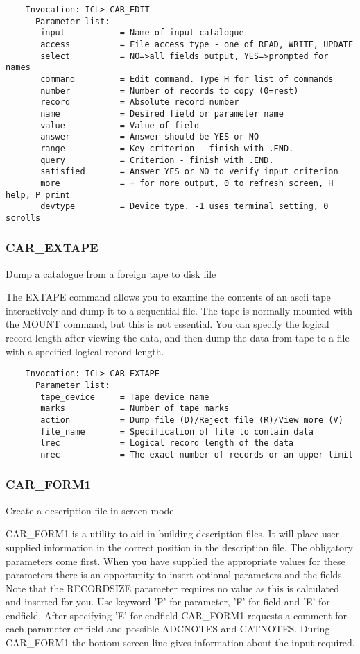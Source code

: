 \begin{verbatim}
    Invocation: ICL> CAR_EDIT
      Parameter list:
       input           = Name of input catalogue
       access          = File access type - one of READ, WRITE, UPDATE
       select          = NO=>all fields output, YES=>prompted for names
       command         = Edit command. Type H for list of commands
       number          = Number of records to copy (0=rest)
       record          = Absolute record number
       name            = Desired field or parameter name
       value           = Value of field
       answer          = Answer should be YES or NO
       range           = Key criterion - finish with .END.
       query           = Criterion - finish with .END.
       satisfied       = Answer YES or NO to verify input criterion
       more            = + for more output, 0 to refresh screen, H help, P print
       devtype         = Device type. -1 uses terminal setting, 0 scrolls
\end{verbatim}

\subsubsection{CAR\_EXTAPE}

Dump a catalogue from a foreign tape to disk file


The EXTAPE command allows you to examine the contents of an ascii tape
interactively and dump it to a sequential file.
The tape is normally mounted with the MOUNT command, but this is not essential.
You can specify the logical record length after viewing the data, and then
dump the data from tape to a file with a specified logical record length.
\begin{verbatim}
    Invocation: ICL> CAR_EXTAPE
      Parameter list:
       tape_device     = Tape device name
       marks           = Number of tape marks
       action          = Dump file (D)/Reject file (R)/View more (V)
       file_name       = Specification of file to contain data
       lrec            = Logical record length of the data
       nrec            = The exact number of records or an upper limit
\end{verbatim}

\subsubsection{CAR\_FORM1}

Create a description file in screen mode

CAR\_FORM1 is a utility to aid in building description files. It will place
user supplied information in the correct position in the description file.
The obligatory parameters come first. When you have supplied the appropriate
values for these parameters there is an opportunity to insert optional
parameters and the fields. Note that the RECORDSIZE parameter requires no
value as this is calculated and inserted for you. Use keyword 'P' for
parameter, 'F' for field and 'E' for endfield. After specifying 'E' for
endfield CAR\_FORM1 requests a comment for each parameter or field and
possible ADCNOTES and CATNOTES. During CAR\_FORM1 the bottom screen line
gives information about the input required.

